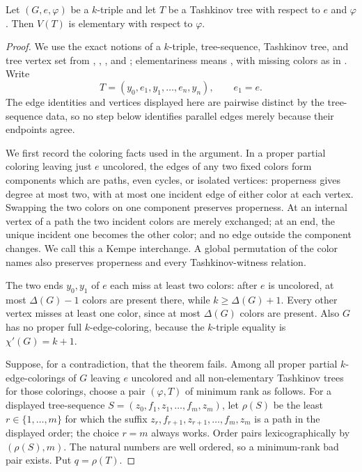 \begin{theorem}
Let $(G,e,\varphi)$ be a $k$-triple and let $T$ be a Tashkinov tree with
respect to $e$ and $\varphi$.  Then $V(T)$ is elementary with respect to
$\varphi$.
\end{theorem}
\begin{proof}
We use the exact notions of a $k$-triple, tree-sequence, Tashkinov tree, and
tree vertex set from , ,
, and ; elementariness
means , with missing colors as in
.  Write
\[
 T=(y_0,e_1,y_1,\ldots,e_n,y_n),\qquad e_1=e.
\]
The edge identities and vertices displayed here are pairwise distinct by the
tree-sequence data, so no step below identifies parallel edges merely because
their endpoints agree.

We first record the coloring facts used in the argument.  In a proper partial
coloring leaving just $e$ uncolored, the edges of any two fixed colors form
components which are paths, even cycles, or isolated vertices: properness
gives degree at most two, with at most one incident edge of either color at
each vertex.  Swapping the two colors on one component preserves properness.
At an internal vertex of a path the two incident colors are merely exchanged;
at an end, the unique incident one becomes the other color; and no edge
outside the component changes.  We call this a Kempe interchange.  A global
permutation of the color names also preserves properness and every
Tashkinov-witness relation.

The two ends $y_0,y_1$ of $e$ each miss at least two colors: after $e$ is
uncolored, at most $\Delta(G)-1$ colors are present there, while
$k\geq\Delta(G)+1$.  Every other vertex misses at least one color, since at
most $\Delta(G)$ colors are present.  Also $G$ has no proper full
$k$-edge-coloring, because the $k$-triple equality is
$\chi'(G)=k+1$.

Suppose, for a contradiction, that the theorem fails.  Among all proper
partial $k$-edge-colorings of $G$ leaving $e$ uncolored and all non-elementary
Tashkinov trees for those colorings, choose a pair $(\varphi,T)$ of minimum
rank as follows.  For a displayed tree-sequence
$S=(z_0,f_1,z_1,\ldots,f_m,z_m)$, let $\rho(S)$ be the least
$r\in\{1,\ldots,m\}$ for which the suffix
$z_r,f_{r+1},z_{r+1},\ldots,f_m,z_m$ is a path in the displayed order; the
choice $r=m$ always works.  Order pairs lexicographically by
$(\rho(S),m)$.  The natural numbers are well ordered, so a minimum-rank bad
pair exists.  Put $q=\rho(T)$.


\end{proof}
